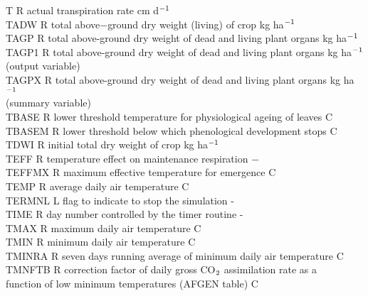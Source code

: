 \begin{tabbing}
T       \> \> R   \> actual transpiration rate                          \> \> \> \> \> \> \> cm d$^{{\rm -1}}$\\
TADW    \> \> R   \> total above$-$ground dry weight (living) of crop     \> \> \> \> \> \> \> kg ha$^{{\rm -1}}$\\
TAGP\> \> R\> total above-ground dry weight of dead and living plant organs\> \> \> \> \> \> \> kg ha$^{{\rm -1}}$\\
TAGP1\> \> R\> total above-ground dry weight of dead and living plant organs \> \> \> \> \> \> \> kg ha$^{{\rm -1}}$\\
\>\> \> (output variable)\\
TAGPX\> \> R\> total above-ground dry weight of dead and living plant organs \> \> \> \> \> \> \> kg ha$^{{\rm -1}}$\\
\>\> \> (summary variable)\\
TBASE\> \> R\> lower threshold temperature for physiological ageing of leaves\> \> \> \> \> \> \> \degrees C \\
TBASEM\> \> R\> lower threshold below which phenological development stops \> \> \> \> \> \> \> \degrees C\\
TDWI\> \> R\> initial total dry weight of crop\> \> \> \> \> \> \> kg ha$^{{\rm -1}}$ \\
TEFF    \> \> R   \> temperature effect on maintenance respiration      \> \> \> \> \> \> \> $-$\\
TEFFMX\> \> R\> maximum effective temperature for emergence\> \> \> \> \> \> \> \degrees C\\
TEMP    \> \> R   \> average daily air temperature                      \> \> \> \> \> \> \> \degrees C\\
TERMNL\> \> L\> flag to indicate to stop the simulation\> \> \> \> \> \> \> -\\
TIME\> \> R\> day number controlled by the timer routine\> \> \> \> \> \> \> -\\
TMAX    \> \> R   \> maximum daily air temperature                      \> \> \> \> \> \> \> \degrees C\\
TMIN    \> \> R   \> minimum daily air temperature                      \> \> \> \> \> \> \> \degrees C\\
TMINRA  \> \> R   \> seven days running average of minimum daily air temperature   \> \> \> \> \> \> \> \degrees C\\
TMNFTB\> \> R\> correction factor of daily gross CO$_{{\rm 2}}$ assimilation rate as a\\
\>\> \> function of low minimum temperatures (AFGEN table)\> \> \> \> \> \> \> \degrees C\\

\end{tabbing}
